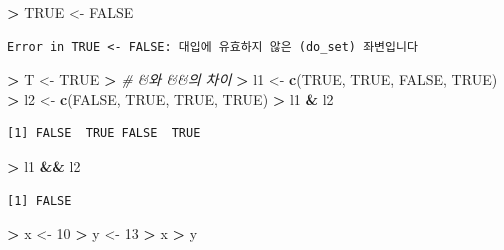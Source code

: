 \documentclass[11pt,a4paper]{book}
\newenvironment{Shaded}{\begin{snugshade}}{\end{snugshade}}
\newcommand{\KeywordTok}[1]{\textcolor[rgb]{0.13,0.29,0.53}{\textbf{#1}}}
\newcommand{\DecValTok}[1]{\textcolor[rgb]{0.00,0.00,0.81}{#1}}
\newcommand{\StringTok}[1]{\textcolor[rgb]{0.31,0.60,0.02}{#1}}
\newcommand{\CommentTok}[1]{\textcolor[rgb]{0.56,0.35,0.01}{\textit{#1}}}
\newcommand{\OtherTok}[1]{\textcolor[rgb]{0.56,0.35,0.01}{#1}}
\newcommand{\OperatorTok}[1]{\textcolor[rgb]{0.81,0.36,0.00}{\textbf{#1}}}
\newcommand{\ErrorTok}[1]{\textcolor[rgb]{0.64,0.00,0.00}{\textbf{#1}}}
\newcommand{\NormalTok}[1]{#1}
\theoremstyle{definition}
\theoremstyle{definition}
\theoremstyle{definition}
\theoremstyle{remark}
\begin{document}
\begin{Shaded}
\begin{Highlighting}[]
\OperatorTok{>}\StringTok{ }\OtherTok{TRUE}\NormalTok{ <-}\StringTok{ }\OtherTok{FALSE}
\end{Highlighting}
\end{Shaded}

\begin{verbatim}
Error in TRUE <- FALSE: 대입에 유효하지 않은 (do_set) 좌변입니다
\end{verbatim}

\begin{Shaded}
\begin{Highlighting}[]
\OperatorTok{>}\StringTok{ }\NormalTok{T <-}\StringTok{ }\OtherTok{TRUE}
\OperatorTok{>}\StringTok{ }\CommentTok{# &와 &&의 차이}
\ErrorTok{>}\StringTok{ }\NormalTok{l1 <-}\StringTok{ }\KeywordTok{c}\NormalTok{(}\OtherTok{TRUE}\NormalTok{, }\OtherTok{TRUE}\NormalTok{, }\OtherTok{FALSE}\NormalTok{, }\OtherTok{TRUE}\NormalTok{)}
\OperatorTok{>}\StringTok{ }\NormalTok{l2 <-}\StringTok{ }\KeywordTok{c}\NormalTok{(}\OtherTok{FALSE}\NormalTok{, }\OtherTok{TRUE}\NormalTok{, }\OtherTok{TRUE}\NormalTok{, }\OtherTok{TRUE}\NormalTok{)}
\OperatorTok{>}\StringTok{ }\NormalTok{l1 }\OperatorTok{&}\StringTok{ }\NormalTok{l2}
\end{Highlighting}
\end{Shaded}

\begin{verbatim}
[1] FALSE  TRUE FALSE  TRUE
\end{verbatim}

\begin{Shaded}
\begin{Highlighting}[]
\OperatorTok{>}\StringTok{ }\NormalTok{l1 }\OperatorTok{&&}\StringTok{ }\NormalTok{l2}
\end{Highlighting}
\end{Shaded}

\begin{verbatim}
[1] FALSE
\end{verbatim}

\begin{Shaded}
\begin{Highlighting}[]
\OperatorTok{>}\StringTok{ }\NormalTok{x <-}\StringTok{ }\DecValTok{10}
\OperatorTok{>}\StringTok{ }\NormalTok{y <-}\StringTok{ }\DecValTok{13}
\OperatorTok{>}\StringTok{ }\NormalTok{x }\OperatorTok{>}\StringTok{ }\NormalTok{y}
\end{Highlighting}
\end{Shaded}
\end{document}
